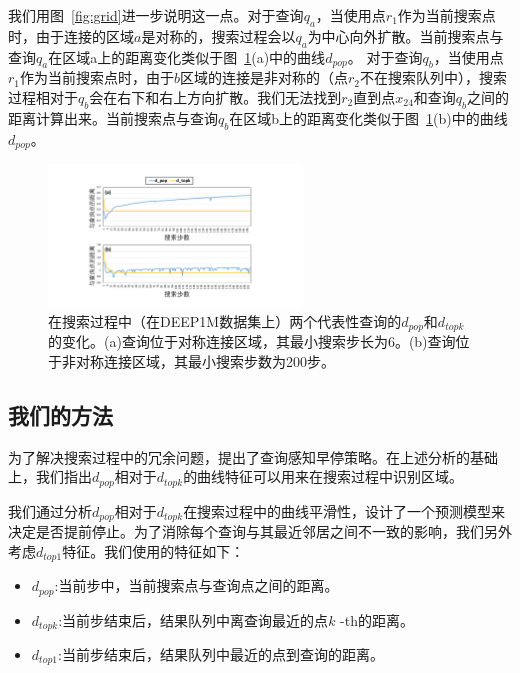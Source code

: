 我们用图~\ref{fig:grid}进一步说明这一点。对于查询$q_a$，当使用点$r_1$作为当前搜索点时，由于连接的区域$a$是对称的，搜索过程会以$q_a$为中心向外扩散。当前搜索点与查询$q_a$在区域a上的距离变化类似于图~\ref{fig:search-path}(a)中的曲线$d_{pop}$。
对于查询$q_b$，当使用点$r_1$作为当前搜索点时，由于$b$区域的连接是非对称的（点$r_2$不在搜索队列中），搜索过程相对于$q_b$会在右下和右上方向扩散。我们无法找到$r_2$直到点$x_{24}$和查询$q_b$之间的距离计算出来。当前搜索点与查询$q_b$在区域b上的距离变化类似于图~\ref{fig:search-path}(b)中的曲线$d_{pop}$。

\begin{figure}[tp]
  \centering
  \includegraphics[width=0.6\textwidth]{figures/context-1/dist-feature.pdf}
  \caption{在搜索过程中（在DEEP1M数据集上）两个代表性查询的$d_{pop}$和$d_{topk}$的变化。(a)查询位于对称连接区域，其最小搜索步长为6。(b)查询位于非对称连接区域，其最小搜索步数为200步。}
  \label{fig:search-path}
\end{figure}

\subsection{我们的方法}
为了解决搜索过程中的冗余问题，提出了查询感知早停策略。在上述分析的基础上，我们指出$d_{pop}$相对于$d_{topk}$的曲线特征可以用来在搜索过程中识别区域。

我们通过分析$d_{pop}$相对于$d_{topk}$在搜索过程中的曲线平滑性，设计了一个预测模型来决定是否提前停止。为了消除每个查询与其最近邻居之间不一致的影响，我们另外考虑$d_{top1}$特征。我们使用的特征如下：
\begin{itemize}
    \item $d_{pop}$:当前步中，当前搜索点与查询点之间的距离。
    \item $d_{topk}$:当前步结束后，结果队列中离查询最近的点$k$ -th的距离。
    \item $d_{top1}$:当前步结束后，结果队列中最近的点到查询的距离。
\end{itemize}

